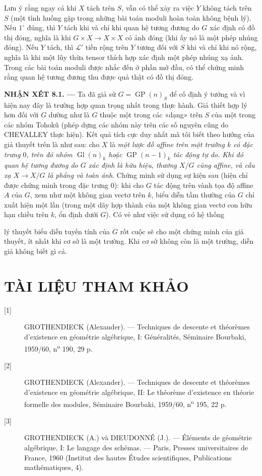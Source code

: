 \documentclass[11pt,twoside,openany]{book}
\numberwithin{equation}{section}
\newcommand{\src}[1]{%
  \phantomsection\hypertarget{src:\fgasourceid:#1}{}%
  \marginpar{\raggedleft\footnotesize\sffamily #1}%
}
\newcommand{\fgasourceid}{unset}
\begin{document}
Lưu ý rằng ngay cả khi $X$ tách trên $S$, vẫn có thể xảy ra việc $Y$ không
tách trên $S$ (một tình huống gặp trong những bài toán moduli hoàn toàn không
bệnh lý). Nếu $1^\circ$ đúng, thì $Y$ tách khi và chỉ khi quan hệ tương đương
do $G$ xác định có đồ thị đóng, nghĩa là khi $G\times X\to X\times X$ có ảnh
đóng (khi ấy nó là một phép nhúng đóng). Nếu $Y$ tách, thì $\mathcal L'$ tiền
rộng trên $Y$ tương đối với $S$ khi và chỉ khi nó rộng, nghĩa là khi một lũy
thừa tensor thích hợp xác định một phép nhúng xạ ảnh. Trong các bài toán moduli
được nhắc đến ở phần mở đầu, có thể chứng minh rằng quan hệ tương đương thu
được quả thật có đồ thị đóng.

\medskip
\noindent\textbf{NHẬN XÉT 8.1. ---} Ta đã giả sử
$G=\operatorname{GP}(n)_S$ để cố định ý tưởng và vì hiện nay đây là trường hợp
quan trọng nhất trong thực hành. Giả thiết hợp lý hơn đối với $G$ dường như là
$G$ thuộc một trong các «dạng» trên $S$ của một trong các nhóm Tohokû (phép
dựng các nhóm này trên các số nguyên cũng do CHEVALLEY thực hiện). Kết quả tích
cực duy nhất mà tôi biết theo hướng của giả thuyết trên là như sau: cho $X$ là
\emph{một lược đồ affine trên một trường $k$ có đặc trưng $0$, trên đó nhóm
$\operatorname{Gl}(n)_k$ hoặc $\operatorname{GP}(n-1)_k$ tác động tự do. Khi
đó quan hệ tương đương do $G$ xác định là hữu hiệu, thương $X/G$ cũng affine,
và cấu xạ $X\to X/G$ là phẳng và toàn ánh}. Chứng minh sử dụng sự kiện sau
(hiện chỉ được chứng minh trong đặc trưng $0$): khi cho $G$ tác động trên vành
tọa độ affine $A$ của $G$, xem như một không gian vectơ trên $k$, biểu diễn tầm
thường của $G$ chỉ xuất hiện một lần (trong một dãy hợp thành của một không
gian vectơ con hữu hạn chiều trên $k$, ổn định dưới $G$). Có vẻ như việc sử
dụng có hệ thống
\src{118}
lý thuyết biểu diễn tuyến tính của $G$ rốt cuộc sẽ cho một chứng minh của
giả thuyết, ít nhất khi cơ sở là một trường. Khi cơ sở không còn là một trường,
diễn giả không biết gì cả.

\section*{TÀI LIỆU THAM KHẢO}

\begin{description}
\item[{[1]}] GROTHENDIECK (Alexander). --- Techniques de descente et théorèmes
d'existence en géométrie algébrique, I: Généralités, Séminaire Bourbaki,
1959/60, n\textsuperscript{o} 190, 29 p.

\item[{[2]}] GROTHENDIECK (Alexander). --- Techniques de descente et théorèmes
d'existence en géométrie algébrique, II: Le théorème d'existence en théorie
formelle des modules, Séminaire Bourbaki, 1959/60,
n\textsuperscript{o} 195, 22 p.

\item[{[3]}] GROTHENDIECK (A.) và DIEUDONNÉ (J.). --- Éléments de géométrie
algébrique, I: Le langage des schémas. --- Paris, Presses universitaires de
France, 1960 (Institut des hautes Études scientifiques, Publications
mathématiques, 4).
\end{description}
\end{document}
